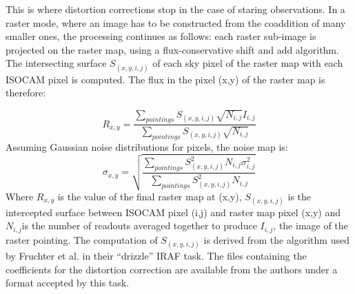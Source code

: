 This is where distortion corrections stop in the case of staring
observations. In a raster mode, where an image has to be constructed
from the coaddition of many smaller ones, the processing continues as
follows: each raster sub-image is projected on the raster map, using a
flux-conservative shift and add algorithm.  The intersecting surface
$S_{(x,y,i,j)}$ of each sky pixel of the raster map with each ISOCAM
pixel is computed. The flux in the pixel (x,y) of the raster map is
therefore:
 
\begin{equation}
R_{x,y} = \frac{\sum_{pointings}S_{(x,y,i,j)}\sqrt{N_{i,j}}I_{i,j}}
{\sum_{pointings}S_{(x,y,i,j)}\sqrt{N_{i,j}}}    
\end{equation}
Assuming Gaussian noise distributions for pixels, the noise 
map is:
\begin{equation}
\sigma_{x,y} = 
\sqrt{\frac{\sum_{pointings}S^{2}_{(x,y,i,j)}N_{i,j}\sigma^{2}_{i,j}}
{\sum_{pointings}S^{2}_{(x,y,i,j)}N_{i,j}}}    
\end{equation} 
Where $R_{x,y}$ is the value of the final raster map at (x,y), 
$S_{(x,y,i,j)}$ is the intercepted surface between ISOCAM pixel (i,j) 
and raster map pixel (x,y) and $N_{i,j}$is the number of readouts   
  averaged together to produce $I_{i,j}$, the image of the raster 
pointing. The computation of $S_{(x,y,i,j)}$ is derived from the 
algorithm used by Fruchter et al. in their ``drizzle'' IRAF task.
The files containing the coefficients for the distortion 
correction are available from the authors under a format accepted by 
this task.

 



 
 
 


